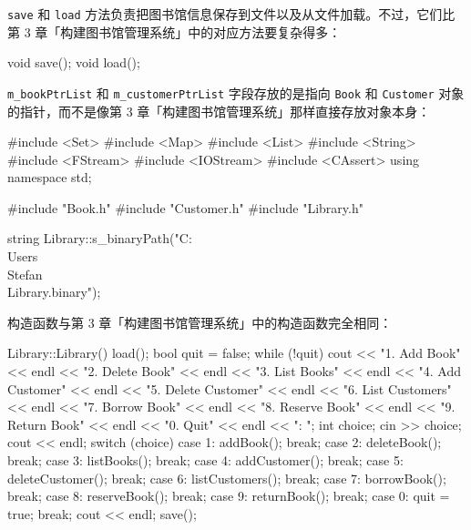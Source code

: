 \texttt{save} 和 \texttt{load} 方法负责把图书馆信息保存到文件以及从文件加载。不过，它们比第 3 章「构建图书馆管理系统」中的对应方法要复杂得多：

\begin{codebox}
    void save();
    void load();
\end{codebox}

\texttt{m\_bookPtrList} 和 \texttt{m\_customerPtrList} 字段存放的是指向 \texttt{Book} 和 \texttt{Customer} 对象的指针，而不是像第 3 章「构建图书馆管理系统」那样直接存放对象本身：

\begin{codebox}
    list<Book*> m_bookPtrList;
    list<Customer*> m_customerPtrList;
};
\end{codebox}

\medskip{}

\begin{codebox}
#include <Set>
#include <Map>
#include <List>
#include <String>
#include <FStream>
#include <IOStream>
#include <CAssert>
using namespace std;

#include "Book.h"
#include "Customer.h"
#include "Library.h"

string Library::s_binaryPath("C:\\Users\\Stefan\\Library.binary");
\end{codebox}

构造函数与第 3 章「构建图书馆管理系统」中的构造函数完全相同：

\begin{codebox}
Library::Library() {
  load();
  bool quit = false;
  while (!quit) {
    cout << "1. Add Book" << endl
         << "2. Delete Book" << endl
         << "3. List Books" << endl
         << "4. Add Customer" << endl
         << "5. Delete Customer" << endl
         << "6. List Customers" << endl
         << "7. Borrow Book" << endl
         << "8. Reserve Book" << endl
         << "9. Return Book" << endl
         << "0. Quit" << endl
         << ": ";
    int choice;
    cin >> choice;
    cout << endl;
    switch (choice) {
      case 1:
        addBook();
        break;
      case 2:
        deleteBook();
        break;
      case 3:
        listBooks();
        break;
      case 4:
        addCustomer();
        break;
      case 5:
        deleteCustomer();
        break;
      case 6:
        listCustomers();
        break;
      case 7:
        borrowBook();
        break;
      case 8:
        reserveBook();
        break;
      case 9:
        returnBook();
        break;
      case 0:
        quit = true;
        break;
    }
    cout << endl;
  }
  save();
}
\end{codebox}

